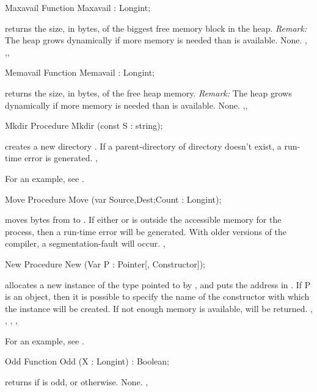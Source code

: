 \documentclass{report}
\begin{document}

\begin{function}{Maxavail}
\Declaration
Function Maxavail  : Longint;

\Description
{} returns the size, in bytes, of the biggest free memory block in
the heap.
{\em Remark:} The heap grows dynamically if more memory is needed than is
available.
\Errors
None.
\SeeAlso
{}, ,, 
\end{function}


\begin{function}{Memavail}
\Declaration
Function Memavail  : Longint;

\Description
{} returns the size, in bytes, of the free heap memory.
{\em Remark:} The heap grows dynamically if more memory is needed than is
available.
\Errors
None.
\SeeAlso
{},, 
\end{function}


\begin{procedure}{Mkdir}
\Declaration
Procedure Mkdir (const S : string);

\Description
{} creates a new  directory .
\Errors
If a parent-directory of directory  doesn't exist, a run-time error is generated.
\SeeAlso
{}, 
\end{procedure}
For an example, see .
\begin{procedure}{Move}
\Declaration
Procedure Move (var Source,Dest;Count : Longint);

\Description
{} moves  bytes from  to .
\Errors
If either  or  is outside the accessible memory for
the process, then a run-time error will be generated. With older versions of
the compiler, a segmentation-fault will occur.
\SeeAlso
{}, 
\end{procedure}


\begin{procedure}{New}
\Declaration
Procedure New (Var P : Pointer[, Constructor]);

\Description
{} allocates a new instance of the type pointed to by , and
puts the address in .
If P is an object, then it is possible to
specify the name of the constructor with which the instance will be created.
\Errors
If not enough memory is available,  will be returned.
\SeeAlso
{}, , , ,
\end{procedure}
For an example, see .
\begin{function}{Odd}
\Declaration
Function Odd (X : Longint) : Boolean;

\Description
{} returns  if  is odd, or  otherwise.
\Errors
None.
\SeeAlso
{}, 
\end{function}
\end{document}

